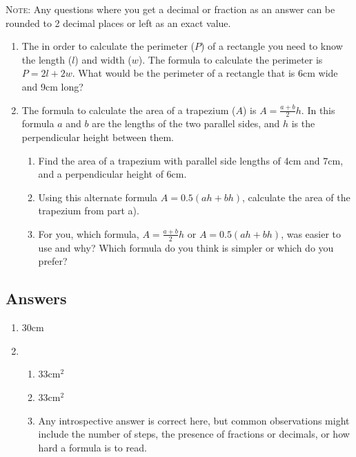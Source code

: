 \documentclass[a4paper,12pt]{article}
\begin{document}
\textsc{Note}: Any questions where you get a decimal or fraction 
as an answer can be rounded to 2 decimal places or left as 
an exact value.

\begin{enumerate}
\item The in order to calculate the perimeter ($P$) of a rectangle 
    you need to know the length ($l$) and width ($w$). The formula
    to calculate the perimeter is $P = 2l + 2w$. What would be
    the perimeter of a rectangle that is 6cm wide and 9cm long?

\item The formula to calculate the area of a trapezium ($A$) is
    $A = \frac{a + b}{2}h$. In this formula $a$ and 
    $b$ are the lengths of the two parallel sides, and $h$ is the 
    perpendicular height between them.
    \begin{enumerate}
    \item Find the area of a trapezium with parallel side lengths 
        of 4cm and 7cm, and a perpendicular height of 6cm.
    \item Using this alternate formula 
        $A = 0.5(ah + bh)$, calculate the 
        area of the trapezium from part a).
    \item For you, which formula, $A = \frac{a + b}{2}h$
        or $A = 0.5(ah + bh)$, was easier to use and why? Which 
        formula do you think is simpler or which do you prefer?
    \end{enumerate}

\end{enumerate}

\newpage
\subsection*{Answers}

\begin{enumerate}
\item 30cm %

\item %
    \begin{enumerate}
    \item 33cm$^2$
    \item 33cm$^2$
    \item Any introspective answer is correct here, but common 
        observations might include the number of steps, the presence 
        of fractions or decimals, or how hard a formula is to read.
    \end{enumerate}
\end{enumerate}
\end{document}
